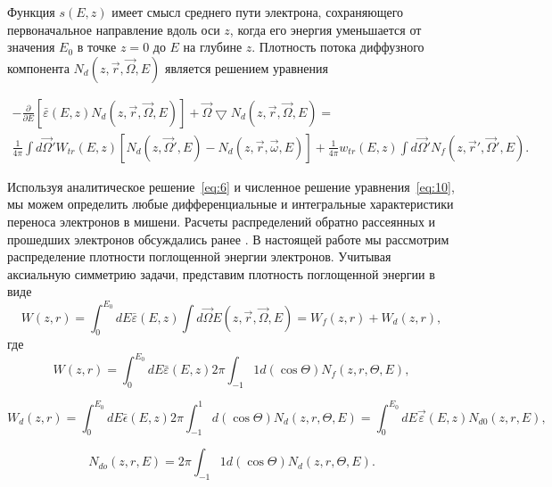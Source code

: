 Функция $s(E, z)$ имеет смысл среднего пути электрона, сохраняющего первоначальное
направление вдоль оси $z$, когда его энергия уменьшается от значения $E_0$ в точке $z=0$ до $E$
на глубине $z$.
Плотность потока диффузного компонента $N_d(z,\vec{r},\vec{\Omega},E)$ является решением
уравнения \cite{smolar}

\begin{gather}
-\frac{\partial}{\partial E}[\bar{\varepsilon}(E,z)N_d(z,\vec{r},\vec{\Omega},E)]+\vec{\Omega} \bigtriangledown N_d (z,\vec{r},\vec{\Omega},E)= \nonumber \\
\frac{1}{4\pi} \int d\vec{\Omega}'W_{tr}(E,z)[N_d(z,\vec{\Omega}',E)-N_d(z,\vec{r},\vec{\omega},E)]+\frac{1}{4\pi}w_{tr}(E,z) \int d\vec{\Omega}'N_f(z,\vec{r}',\vec{\Omega}',E).
\label{eq:10}
\end{gather}

Используя аналитическое решение~\ref{eq:6} и численное решение уравнения~\ref{eq:10}, мы
можем определить любые дифференциальные и интегральные характеристики переноса
электронов в мишени. Расчеты распределений обратно рассеянных и прошедших
электронов обсуждались ранее \cite{smolar}. В настоящей работе мы рассмотрим распределение
плотности поглощенной энергии электронов.
Учитывая аксиальную симметрию задачи, представим плотность поглощенной
энергии в виде
\begin{equation}
W(z,r)=\int_{0}^{E_0} dE\bar{\varepsilon}(E,z) \int d\vec{\Omega}E(z,\vec{r},\vec{\Omega},E)=W_f(z,r)+W_d(z,r),
\label{eq:11}
\end{equation}
где
\begin{equation}
W(z,r)=\int_{0}^{E_0} dE\bar{\varepsilon}(E,z)2\pi \int_{-1}{1} d(\cos \Theta)N_f(z,r,\Theta ,E),
\label{eq:12}
\end{equation}

\begin{equation}
W_{d}(z,r)=\int_{0}^{E_0} dE\bar{\epsilon}(E,z)2\pi \int_{-1}^{1} d(\cos \Theta)N_d(z,r,\Theta ,E)=\int_{0}^{E_0}dE\vec{\varepsilon}(E,z)N_{d0}(z,r,E),
\label{eq:13}
\end{equation}

\begin{equation}
N_{do}(z,r,E)=2\pi \int_{-1}{1} d(\cos \Theta)N_d(z,r,\Theta,E).
\label{eq:14}
\end{equation}

